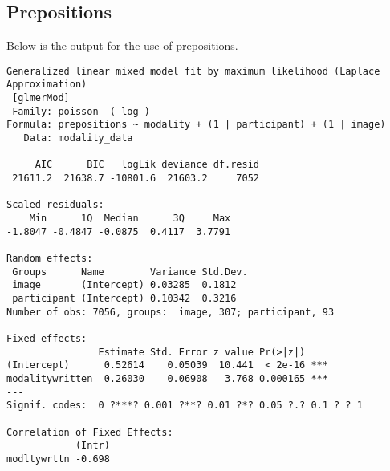 \documentclass[11pt]{article}
\begin{document}
\subsection{Prepositions}
Below is the output for the use of prepositions.
\begin{verbatim}
Generalized linear mixed model fit by maximum likelihood (Laplace  Approximation)
 [glmerMod]
 Family: poisson  ( log )
Formula: prepositions ~ modality + (1 | participant) + (1 | image)
   Data: modality_data

     AIC      BIC   logLik deviance df.resid 
 21611.2  21638.7 -10801.6  21603.2     7052 

Scaled residuals: 
    Min      1Q  Median      3Q     Max 
-1.8047 -0.4847 -0.0875  0.4117  3.7791 

Random effects:
 Groups      Name        Variance Std.Dev.
 image       (Intercept) 0.03285  0.1812  
 participant (Intercept) 0.10342  0.3216  
Number of obs: 7056, groups:  image, 307; participant, 93

Fixed effects:
                Estimate Std. Error z value Pr(>|z|)    
(Intercept)      0.52614    0.05039  10.441  < 2e-16 ***
modalitywritten  0.26030    0.06908   3.768 0.000165 ***
---
Signif. codes:  0 ?***? 0.001 ?**? 0.01 ?*? 0.05 ?.? 0.1 ? ? 1

Correlation of Fixed Effects:
            (Intr)
modltywrttn -0.698
\end{verbatim}



\end{document}
